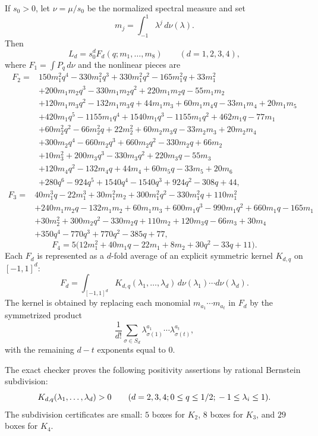 \documentclass[11pt]{article}
\begin{document}
If $s_0>0$, let $\nu=\mu/s_0$ be the normalized spectral measure and set
\[
        m_j=\int_{-1}^{1}\lambda^j\,d\nu(\lambda).
\]
Then
\[
        L_d=s_0^dF_d(q;m_1,\ldots,m_8)
        \qquad (d=1,2,3,4),
\]
where $F_1=\int P_q\,d\nu$ and the nonlinear pieces are
\begin{align*}
F_2={}&150m_1^2q^4-330m_1^2q^3+330m_1^2q^2-165m_1^2q+33m_1^2 \\
&+200m_1m_2q^3-330m_1m_2q^2+220m_1m_2q-55m_1m_2 \\
&+120m_1m_3q^2-132m_1m_3q+44m_1m_3+60m_1m_4q-33m_1m_4+20m_1m_5 \\
&+420m_1q^5-1155m_1q^4+1540m_1q^3-1155m_1q^2+462m_1q-77m_1 \\
&+60m_2^2q^2-66m_2^2q+22m_2^2+60m_2m_3q-33m_2m_3+20m_2m_4 \\
&+300m_2q^4-660m_2q^3+660m_2q^2-330m_2q+66m_2 \\
&+10m_3^2+200m_3q^3-330m_3q^2+220m_3q-55m_3 \\
&+120m_4q^2-132m_4q+44m_4+60m_5q-33m_5+20m_6 \\
&+280q^6-924q^5+1540q^4-1540q^3+924q^2-308q+44,
\end{align*}
\begin{align*}
F_3={}&40m_1^3q-22m_1^3+30m_1^2m_2+300m_1^2q^2-330m_1^2q+110m_1^2 \\
&+240m_1m_2q-132m_1m_2+60m_1m_3+600m_1q^3-990m_1q^2+660m_1q-165m_1 \\
&+30m_2^2+300m_2q^2-330m_2q+110m_2+120m_3q-66m_3+30m_4 \\
&+350q^4-770q^3+770q^2-385q+77,
\end{align*}
\[
        F_4=5\bigl(12m_1^2+40m_1q-22m_1+8m_2+30q^2-33q+11\bigr).
\]
Each $F_d$ is represented as a $d$-fold average of an explicit symmetric kernel $K_{d,q}$ on $[-1,1]^d$:
\[
        F_d=\int_{[-1,1]^d}K_{d,q}(\lambda_1,\ldots,\lambda_d)
        \,d\nu(\lambda_1)\cdots d\nu(\lambda_d).
\]
The kernel is obtained by replacing each monomial $m_{a_1}\cdots m_{a_t}$ in $F_d$ by the symmetrized product
\[
        \frac1{d!}\sum_{\sigma\in S_d}
        \lambda_{\sigma(1)}^{a_1}\cdots\lambda_{\sigma(t)}^{a_t},
\]
with the remaining $d-t$ exponents equal to $0$.

The exact checker proves the following positivity assertions by rational Bernstein subdivision:
\begin{equation}\label{eq:Kd-positive}
        K_{d,q}(\lambda_1,
        \ldots,\lambda_d)>0
        \qquad
        (d=2,3,4;\\ 0\le q\le1/2;\\ -1\le\lambda_i\le1).
\end{equation}
The subdivision certificates are small: $5$ boxes for $K_2$, $8$ boxes for $K_3$, and $29$ boxes for $K_4$.
\end{document}
